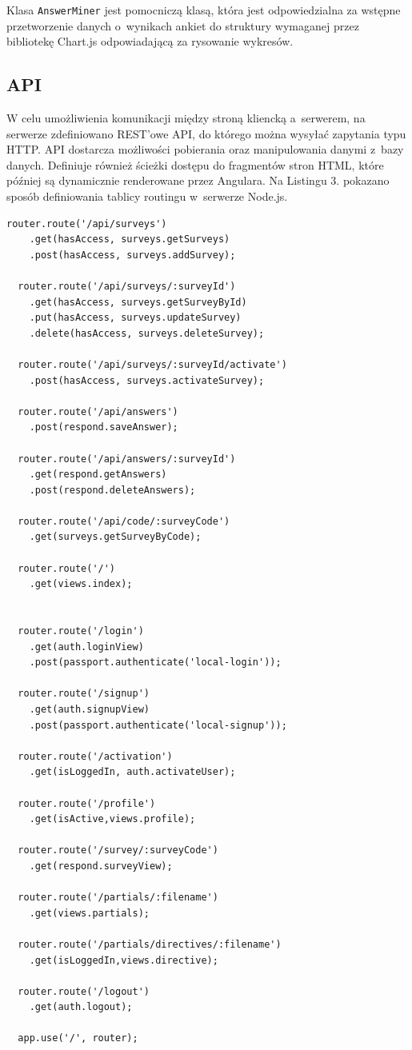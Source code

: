 \documentclass[8pt,a4paper,notitlepage]{article}
\begin{document}
\par Klasa \texttt{AnswerMiner} jest pomocniczą klasą, która jest odpowiedzialna za wstępne przetworzenie danych o~wynikach ankiet do struktury wymaganej przez bibliotekę Chart.js odpowiadającą za rysowanie wykresów.

\subsection{API}
W celu umożliwienia komunikacji między stroną kliencką a~serwerem, na serwerze zdefiniowano REST'owe API, do którego można wysyłać zapytania typu HTTP. API dostarcza możliwości pobierania oraz manipulowania danymi z~bazy danych. Definiuje również ścieżki dostępu do fragmentów stron HTML, które później są dynamicznie renderowane przez Angulara. Na Listingu 3. pokazano sposób definiowania tablicy routingu w~serwerze Node.js.
\begin{lstlisting}[caption=Definicja routingu w~Node.js ]
  router.route('/api/surveys')
    .get(hasAccess, surveys.getSurveys)
    .post(hasAccess, surveys.addSurvey);

  router.route('/api/surveys/:surveyId')
    .get(hasAccess, surveys.getSurveyById)
    .put(hasAccess, surveys.updateSurvey)
    .delete(hasAccess, surveys.deleteSurvey);

  router.route('/api/surveys/:surveyId/activate')
    .post(hasAccess, surveys.activateSurvey);

  router.route('/api/answers')
    .post(respond.saveAnswer);

  router.route('/api/answers/:surveyId')
    .get(respond.getAnswers)
    .post(respond.deleteAnswers);

  router.route('/api/code/:surveyCode')
    .get(surveys.getSurveyByCode);

  router.route('/')
    .get(views.index);


  router.route('/login')
    .get(auth.loginView)
    .post(passport.authenticate('local-login'));

  router.route('/signup')
    .get(auth.signupView)
    .post(passport.authenticate('local-signup'));

  router.route('/activation')
    .get(isLoggedIn, auth.activateUser);

  router.route('/profile')
    .get(isActive,views.profile);

  router.route('/survey/:surveyCode')
    .get(respond.surveyView);

  router.route('/partials/:filename')
    .get(views.partials);

  router.route('/partials/directives/:filename')
    .get(isLoggedIn,views.directive);

  router.route('/logout')
    .get(auth.logout);

  app.use('/', router);
\end{lstlisting}
\end{document}
